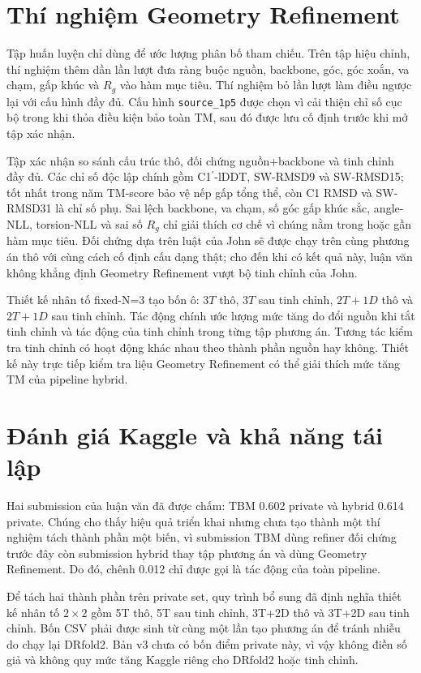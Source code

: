 \documentclass[12pt,a4paper,oneside]{report}
\newcommand{\cprime}{C1$^{\prime}$}
\begin{document}
\section{Thí nghiệm Geometry Refinement}

Tập huấn luyện chỉ dùng để ước lượng phân bố tham chiếu. Trên tập hiệu chỉnh, thí nghiệm
thêm dần lần lượt đưa ràng buộc nguồn, backbone, góc, góc xoắn, va chạm, gấp khúc và
$R_g$ vào hàm mục tiêu. Thí nghiệm bỏ lần lượt làm điều ngược lại với cấu hình đầy đủ.
Cấu hình \texttt{source\_1p5} được chọn vì cải thiện chỉ số cục bộ trong khi thỏa điều
kiện bảo toàn TM, sau đó được lưu cố định trước khi mở tập xác nhận.

Tập xác nhận so sánh cấu trúc thô, đối chứng nguồn+backbone và tinh chỉnh đầy đủ. Các chỉ số độc lập chính gồm
\cprime{}-lDDT, SW-RMSD9 và SW-RMSD15; tốt nhất trong năm TM-score bảo vệ nếp gấp tổng thể,
còn C1 RMSD và SW-RMSD31 là chỉ số phụ. Sai lệch backbone, va chạm, số góc gấp khúc sắc,
angle-NLL, torsion-NLL và sai số $R_g$ chỉ giải thích cơ chế vì chúng nằm trong hoặc gần
hàm mục tiêu. Đối chứng dựa trên luật của John sẽ được chạy trên cùng phương án thô với
cùng cách cố định cấu dạng thật; cho đến khi có kết quả này, luận văn không khẳng định
Geometry Refinement vượt bộ tinh chỉnh của John.

Thiết kế nhân tố fixed-N=3 tạo bốn ô: $3T$ thô, $3T$ sau tinh chỉnh, $2T+1D$ thô và $2T+1D$
sau tinh chỉnh. Tác động chính ước lượng mức tăng do đổi nguồn khi tắt tinh chỉnh và tác
động của tinh chỉnh trong từng tập phương án. Tương tác kiểm tra tinh chỉnh có hoạt động
khác nhau theo thành phần nguồn
hay không. Thiết kế này trực tiếp kiểm tra liệu Geometry Refinement có thể giải thích
mức tăng TM của pipeline hybrid.

\section{Đánh giá Kaggle và khả năng tái lập}

Hai submission của luận văn đã được chấm: TBM 0.602 private và hybrid 0.614 private. Chúng
cho thấy hiệu quả triển khai nhưng chưa tạo thành một thí nghiệm tách thành phần một biến, vì submission TBM
dùng refiner đối chứng trước đây còn submission hybrid thay tập phương án và dùng Geometry
Refinement. Do đó, chênh 0.012 chỉ được gọi là tác động của toàn pipeline.

Để tách hai thành phần trên private set, quy trình bổ sung đã định nghĩa thiết kế nhân tố $2\times2$
gồm 5T thô, 5T sau tinh chỉnh, 3T+2D thô và 3T+2D sau tinh chỉnh. Bốn CSV phải được sinh từ cùng một
lần tạo phương án để tránh nhiễu do chạy lại DRfold2. Bản v3 chưa có bốn điểm private này,
vì vậy không điền số giả và không quy mức tăng Kaggle riêng cho DRfold2 hoặc tinh chỉnh.
\end{document}
